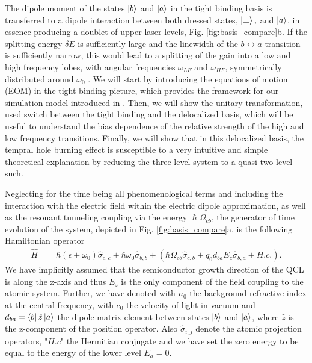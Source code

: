 \documentclass[]{spie}  %
\def\h{\hat}
\def\h{\hat}
\begin{document}
The dipole moment of the states $\ket{b}$ and $\ket{a}$ in the tight binding basis is transferred to a dipole interaction between both dressed states, $\ket{\pm},$ and $\ket{a}$, in essence producing a doublet of upper laser levels, Fig. \ref{fig:basis_compare}b. If the splitting energy $\delta E$ is sufficiently large and the linewidth of the $b\leftrightarrow a$ transition is sufficiently narrow, this would lead to a splitting of the gain into a low and high frequency lobes, with angular frequencies $\omega_{LF}$ and $\omega_{HF}$, symmetrically distributed around $\omega_0$ \cite{dupont2010simplified}. We will start by introducing the equations of motion (EOM) in the tight-binding picture, which provides the framework for our simulation model introduced in . Then, we will show the unitary transformation, used switch between the tight binding and the delocalized basis, which will be useful to understand the bias dependence of the relative strength of the high and low frequency transitions. Finally, we will show that in this delocalized basis, the tempral hole burning effect is susceptible to a very intuitive and simple theoretical explanation by reducing the three level system to a quasi-two level such. 

Neglecting for the time being all phenomenological terms and including the interaction with the electric field within the electric dipole approximation, as well as the resonant tunneling coupling via the energy $\hslash\Omega_{cb}$, the generator of time evolution of the system, depicted in Fig. \ref{fig:basis_compare}a, is the following Hamiltonian operator
\begin{align}
\label{eq:hamiltonian-operatorform}
\h{H} &= \hbar(\epsilon+\omega_0)  \h\sigma_{c,c} +\hbar\omega_0 \h\sigma_{b,b} + (\hbar\Omega_{cb}\h\sigma_{c,b} + q_0d_{ba}E_z \h\sigma_{b,a}+H.c.).
\end{align}
 We have implicitly assumed that the semiconductor growth direction of the QCL is along the z-axis and thus $E_z$ is the only component of the field coupling to the atomic system. Further, we have denoted with $n_0$ the background refractive index at the central frequency, with $c_0$ the velocity of light in vacuum and $d_{ba} = \bra{b}\h{z}\ket{a} $ the dipole matrix element between states $\ket{b}$ and $\ket{a}$, where $\h{z}$ is the z-component of the position operator. Also $\h \sigma_{i,j}$ denote the atomic projection operators, "$H.c$" the Hermitian conjugate and we have set the zero energy to be equal to the energy of the lower level $E_a = 0$.
\end{document}
